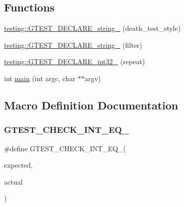 \subsection*{Functions}
\begin{DoxyCompactItemize}
\item 
\mbox{\hyperlink{namespacetesting_a37b7e87f0a5f502c6918f37d1768c1f3}{testing\+::\+G\+T\+E\+S\+T\+\_\+\+D\+E\+C\+L\+A\+R\+E\+\_\+string\+\_\+}} (death\+\_\+test\+\_\+style)
\item 
\mbox{\hyperlink{namespacetesting_a20d69860ce843142c7f740262e6b0c9a}{testing\+::\+G\+T\+E\+S\+T\+\_\+\+D\+E\+C\+L\+A\+R\+E\+\_\+string\+\_\+}} (filter)
\item 
\mbox{\hyperlink{namespacetesting_a315ef0647e4f2795bf1705de8e9c9659}{testing\+::\+G\+T\+E\+S\+T\+\_\+\+D\+E\+C\+L\+A\+R\+E\+\_\+int32\+\_\+}} (repeat)
\item 
int \mbox{\hyperlink{_obj__test_2lib_2googletest-master_2googletest_2test_2gtest__repeat__test_8cc_a3c04138a5bfe5d72780bb7e82a18e627}{main}} (int argc, char $\ast$$\ast$argv)
\end{DoxyCompactItemize}


\subsection{Macro Definition Documentation}
\mbox{\label{_obj__test_2lib_2googletest-master_2googletest_2test_2gtest__repeat__test_8cc_a7e5ba7c523079f679398b4c730184de3}} 
\subsubsection{\texorpdfstring{GTEST\_CHECK\_INT\_EQ\_}{GTEST\_CHECK\_INT\_EQ\_}}
{\footnotesize\ttfamily \#define G\+T\+E\+S\+T\+\_\+\+C\+H\+E\+C\+K\+\_\+\+I\+N\+T\+\_\+\+E\+Q\+\_\+(\begin{DoxyParamCaption}\item[{}]{expected,  }\item[{}]{actual }\end{DoxyParamCaption})}

